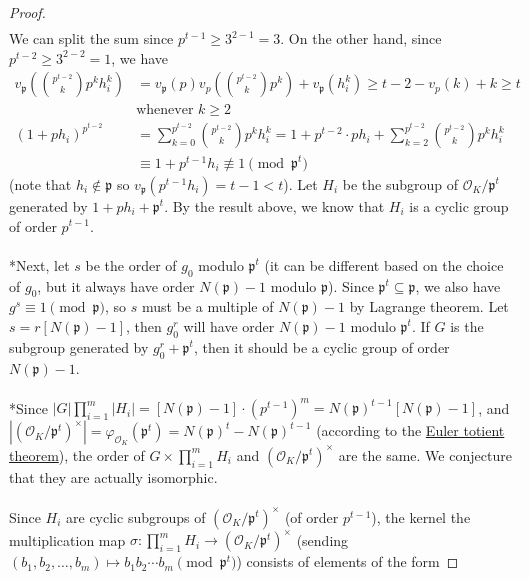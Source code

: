 \documentclass{treatise}
\begin{document}
\begin{proof}
\begin{align*}
\end{align*}
We can split the sum since $p^{t - 1} \geq 3^{2 - 1} = 3$. On the other hand, since $p^{t - 2} \geq 3^{2 - 2} = 1$, we have
\begin{align*}
v_\mathfrak{p} \left( {p^{t - 2} \choose k} p^k h_i^k \right) & = v_\mathfrak{p}(p) v_p \left( {p^{t - 2} \choose k} p^k \right) + v_\mathfrak{p} (h_i^k) \geq t - 2 - v_p (k) + k \geq t \\
& \mbox{whenever } k \geq 2 \\
(1 + p h_i)^{p^{t - 2}} & = \sum_{k = 0}^{p^{t - 2}} {p^{t - 2} \choose k} p^k h_i^k = 1 + p^{t - 2} \cdot p h_i + \sum_{k = 2}^{p^{t - 2}} {p^{t - 2} \choose k} p^k h_i^k \\
& \equiv 1 + p^{t - 1} h_i \not\equiv 1 \pmod{\mathfrak{p}^t}
\end{align*}
(note that $h_i \notin \mathfrak{p}$ so $v_\mathfrak{p}(p^{t - 1} h_i) = t - 1 < t$). Let $H_i$ be the subgroup of $\mathcal{O}_K / \mathfrak{p}^t$ generated by $1 + p h_i + \mathfrak{p}^t$. By the result above, we know that $H_i$ is a cyclic group of order $p^{t - 1}$.
\\
\\
*Next, let $s$ be the order of $g_0$ modulo $\mathfrak{p}^t$ (it can be different based on the choice of $g_0$, but it always have order $N(\mathfrak{p}) - 1$ modulo $\mathfrak{p}$). Since $\mathfrak{p}^t \subseteq \mathfrak{p}$, we also have $g^s \equiv 1 \pmod{\mathfrak{p}}$, so $s$ must be a multiple of $N(\mathfrak{p}) - 1$ by Lagrange theorem. Let $s = r [N(\mathfrak{p}) - 1]$, then $g_0^r$ will have order $N(\mathfrak{p}) - 1$ modulo $\mathfrak{p}^t$. If $G$ is the subgroup generated by $g_0^r + \mathfrak{p}^t$, then it should be a cyclic group of order $N(\mathfrak{p}) - 1$.
\\
\\
*Since $|G| \prod_{i = 1}^m |H_i| = [N(\mathfrak{p}) - 1] \cdot \left( p^{t - 1} \right)^m = N(\mathfrak{p})^{t - 1} [N(\mathfrak{p}) - 1]$, and $|(\mathcal{O}_K / \mathfrak{p}^t)^\times| = \varphi_{\mathcal{O}_K} (\mathfrak{p}^t) = N(\mathfrak{p})^t - N(\mathfrak{p})^{t - 1}$ (according to the \hyperref[eul-totient-thm]{Euler totient theorem}), the order of $G \times \prod_{i = 1}^m H_i$ and $(\mathcal{O}_K / \mathfrak{p}^t)^\times$ are the same. We conjecture that they are actually isomorphic.
\\
\\
Since $H_i$ are cyclic subgroups of $(\mathcal{O}_K / \mathfrak{p}^t)^\times$ (of order $p^{t - 1}$), the kernel the multiplication map $\sigma: \prod_{i = 1}^m H_i \to (\mathcal{O}_K / \mathfrak{p}^t)^\times$ (sending $(b_1, b_2, \hdots, b_m) \mapsto b_1 b_2 \cdots b_m \pmod{\mathfrak{p}^t}$) consists of elements of the form

\end{proof}
\end{document}
